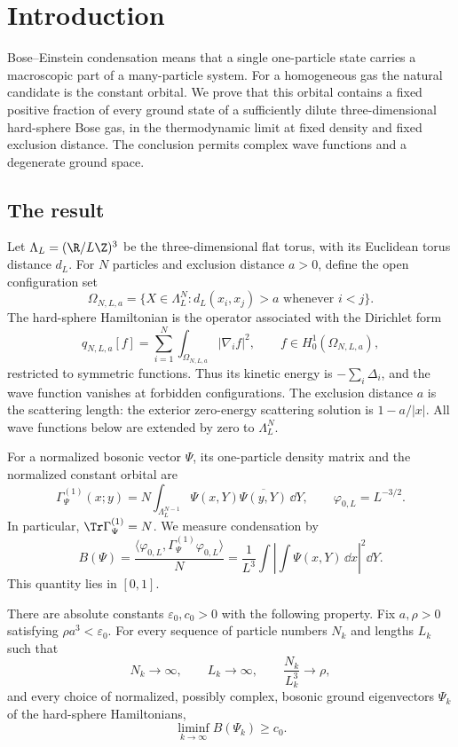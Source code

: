 \section{Introduction}\label{main:introduction}

Bose--Einstein condensation means that a single one-particle state carries
a macroscopic part of a many-particle system. For a homogeneous gas the
natural candidate is the constant orbital. We prove that this orbital
contains a fixed positive fraction of every ground state of a sufficiently
dilute three-dimensional hard-sphere Bose gas, in the thermodynamic limit
at fixed density and fixed exclusion distance. The conclusion permits
complex wave functions and a degenerate ground space.

\subsection{The result}

Let $\Lambda_L=(\R/L\Z)^3$ be the three-dimensional flat torus, with
its Euclidean torus distance $d_L$. For $N$ particles and exclusion
distance $a>0$, define the open configuration set
\[
 \Omega_{N,L,a}
  =\{X\in\Lambda_L^N:d_L(x_i,x_j)>a\text{ whenever }i<j\}.
\]
The hard-sphere Hamiltonian is the operator associated with the Dirichlet
form
\[
 q_{N,L,a}[f]=\sum_{i=1}^N\int_{\Omega_{N,L,a}}|\nabla_i f|^2,
 \qquad f\in H_0^1(\Omega_{N,L,a}),
\]
restricted to symmetric functions. Thus its kinetic energy is
$-\sum_i\Delta_i$, and the wave function vanishes at forbidden
configurations. The exclusion distance $a$ is the scattering length:
the exterior zero-energy scattering solution is $1-a/|x|$.
All wave functions below are extended by zero to $\Lambda_L^N$.

For a normalized bosonic vector $\Psi$, its one-particle density matrix
and the normalized constant orbital are
\[
 \Gamma^{(1)}_\Psi(x;y)
   =N\int_{\Lambda_L^{N-1}}
           \Psi(x,Y)\overline{\Psi(y,Y)}\,\dd Y,
 \qquad \varphi_{0,L}=L^{-3/2}.
\]
In particular, $\Tr\Gamma^{(1)}_\Psi=N$. We measure condensation by
\begin{equation}\label{main:occupation}
 B(\Psi)=\frac{\langle\varphi_{0,L},
                      \Gamma^{(1)}_\Psi\varphi_{0,L}\rangle}{N}
        =\frac1{L^3}\int\left|\int\Psi(x,Y)\,\dd x\right|^2\dd Y.
\end{equation}
This quantity lies in $[0,1]$.

\begin{theorem}\label{main:theorem}
There are absolute constants $\varepsilon_0,c_0>0$ with the following
property. Fix $a,\rho>0$ satisfying $\rho a^3<\varepsilon_0$.
For every sequence of particle numbers $N_k$ and lengths $L_k$ such that
\[
 N_k\longrightarrow\infty,\qquad L_k\longrightarrow\infty,
 \qquad \frac{N_k}{L_k^3}\longrightarrow\rho,
\]
and every choice of normalized, possibly complex, bosonic ground
eigenvectors $\Psi_k$ of the hard-sphere Hamiltonians,
\begin{equation}\label{main:limit}
 \liminf_{k\to\infty} B(\Psi_k)\ge c_0.
\end{equation}
\end{theorem}

